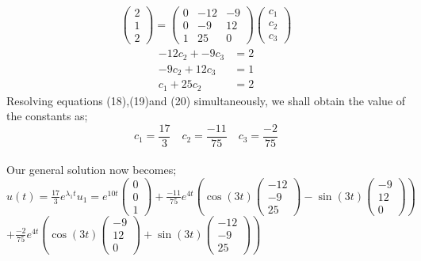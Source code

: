\documentclass[12pt,a4paper]{article}
\begin{document}
\begin{itemize}
\begin{itemize}
\begin{align}
\begin{pmatrix} 2 \\ 1 \\2 \end{pmatrix}=
\begin{pmatrix} 0 & -12 &-9 \\ 0 & -9& 12\\1 &25&0 \end{pmatrix} \begin{pmatrix} c_{1} \\ c_{2}\\c_{3} \end{pmatrix}
\end{align}
\begin{align}
-12c_{2}+-9c_{3}&=2\\
-9c_{2}+12c_{3}&=1\\
c_{1}+25c_{2}&=2
\end{align}
Resolving equations (18),(19)and (20) simultaneously, we shall obtain the value of the constants as;\\
$$c_{1}=\frac{17}{3}\quad c_{2}=\frac{-11}{75}\quad c_{3}=\frac{-2}{75}$$\\
Our general solution now becomes;\\
$u(t)=\frac{17}{3} e^{\lambda_{1}t}u_{1}=e^{10t}\begin{pmatrix} 0 \\ 0 \\1 \end{pmatrix}+\frac{-11}{75} e^{4t}\left(\cos\left(3t\right)\begin{pmatrix} -12 \\ -9 \\25\end{pmatrix}-\sin\left(3t\right)\begin{pmatrix} -9 \\ 12 \\0\end{pmatrix}\right)$ \\
$+\frac{-2}{75} e^{4t}\left(\cos\left(3t\right)\begin{pmatrix} -9 \\ 12 \\0\end{pmatrix}+\sin\left(3t\right)\begin{pmatrix} -12 \\ -9 \\25\end{pmatrix}\right)$\\
\end{itemize}


\end{itemize}
\end{document}
